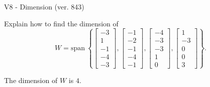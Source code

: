 \begin{exercise}
  \begin{exerciseTitle}V8 - Dimension (ver. 843)\end{exerciseTitle}
  \begin{exerciseStatement}
    Explain how to find the dimension of 
\[W=\mathrm{span}\ \left\{\left[\begin{array}{r}
-3 \\
1 \\
-1 \\
-4 \\
-3
\end{array}\right] , \left[\begin{array}{r}
-1 \\
-2 \\
-1 \\
-4 \\
-1
\end{array}\right] , \left[\begin{array}{r}
-4 \\
-3 \\
-3 \\
1 \\
0
\end{array}\right] , \left[\begin{array}{r}
1 \\
-3 \\
0 \\
0 \\
3
\end{array}\right]\right\}.\]



  \end{exerciseStatement}
  \begin{exerciseAnswer}
   The dimension of \(W\) is  \(4\).
  


  \end{exerciseAnswer}
\end{exercise}